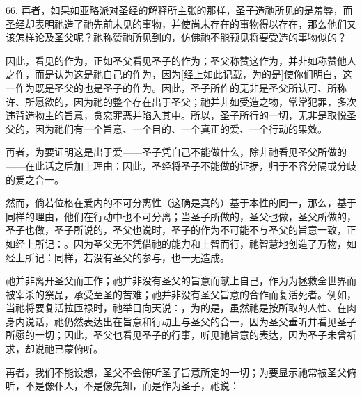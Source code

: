66. 再者，如果如亚略派对圣经的解释所主张的那样，圣子造祂所见的是羞辱，而圣经却表明祂造了祂先前未见的事物，并使尚未存在的事物得以存在，那么他们又该怎样论及圣父呢？祂称赞祂所见到的，仿佛祂不能预见将要受造的事物似的？\par

因此，看见的作为，正如圣父看见圣子的作为；圣父称赞这作为，并非如称赞他人之作，而是认为这是祂自己的作为，因为[经上如此记载，为的是]使你们明白，这一作为既是圣父的也是圣子的作为。因此，圣子所作的无非是圣父所认可、所称许、所愿欲的，因为祂的整个存在出于圣父；祂并非如受造之物，常常犯罪，多次违背造物主的旨意，贪恋罪恶并陷入其中。所以，圣子所行的一切，无非是取悦圣父的，因为祂们有一个旨意、一个目的、一个真正的爱、一个行动的果效。\par

再者，为要证明这是出于爱——圣子凭自己不能做什么，除非祂看见圣父所做的——在此话之后加上理由：因此，圣经将圣子不能做的证据，归于不容分隔或分歧的爱之合一。\par

然而，倘若位格在爱内的不可分离性（这确是真的）基于本性的同一，那么，基于同样的理由，他们在行动中也不可分离；当圣子所做的，圣父也做，圣父所做的，圣子也做，圣子所说的，圣父也说时，圣子的作为不可能不与圣父的旨意一致，正如经上所记：。因为圣父无不凭借祂的能力和上智而行，祂智慧地创造了万物，如经上所记：同样，若没有圣父的参与，也一无造成。\par

祂并非离开圣父而工作；祂并非没有圣父的旨意而献上自己，作为为拯救全世界而被宰杀的祭品，承受至圣的苦难；祂并非没有圣父旨意的合作而复活死者。例如，当祂将要复活拉匝禄时，祂举目向天说：，为的是，虽然祂是按所取的人性、在肉身内说话，祂仍然表达出在旨意和行动上与圣父的合一，因为圣父垂听并看见圣子所愿的一切；因此，圣父也看见圣子的行事，听见祂旨意的表达，因为圣子未曾祈求，却说祂已蒙俯听。\par

再者，我们不能设想，圣父不会俯听圣子旨意所定的一切；为要显示祂常被圣父俯听，不是像仆人，不是像先知，而是作为圣子，祂说：\par

